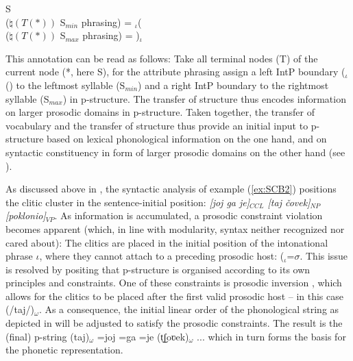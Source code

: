 \documentclass[output=paper,hidelinks]{langscibook}
\begin{document}
\ea\label{ex:Prosody:22}{\hspace{13ex}S\\
($\natural(T(*))$ {\sc S$_{min}$  phrasing)} = $_{\iota}$(\\
($\natural(T(*))$ {\sc S$_{max}$  phrasing)} = )$_{\iota}$
}
\z

\noindent This annotation can be read as follows: Take all terminal nodes (T) of the current node (*, here S), for the attribute {\sc phrasing} assign a left IntP boundary ($_{\iota}$() to the leftmost syllable (S$_{min}$) and a right IntP boundary to the rightmost syllable (S$_{max}$) in p-structure. The transfer of structure thus encodes information on larger prosodic domains in p-structure. 
Taken together, the transfer of vocabulary and the transfer of structure thus provide an initial input to p-structure based on lexical phonological information on the one hand, and on syntactic constituency in form of larger prosodic domains on the other hand (see ).

 As discussed above in , the syntactic analysis of example (\ref{ex:SCB2}) positions the clitic cluster in the sentence-initial position: {\em [joj ga je]$_{CCL}$ [taj \v{c}ovek]$_{NP}$ [poklonio]$_{VP}$}. 
As information is accumulated, a prosodic constraint violation becomes apparent (which, in line with modularity, syntax  neither recognized nor cared about): The clitics are placed in the initial position of the intonational phrase $\iota$, where they cannot attach to a preceding prosodic host: ($_\iota$=$\sigma$. This issue is resolved by positing  that p-structure is organised according to its own principles and constraints. One of these constraints is prosodic inversion \citep{Halpern95}, which allows for the clitics to be placed after the first valid prosodic host -- in this case (/taj/)$_\omega$. As a consequence, the initial linear order of the phonological string as depicted in  will be adjusted to satisfy the prosodic constraints. 
The result is the (final) p-string (taj)$_\omega$ =joj =ga =je (t͜ʃo{ʋ}ek)$_\omega$ ... which in turn forms the basis for the phonetic representation.

\end{document}
